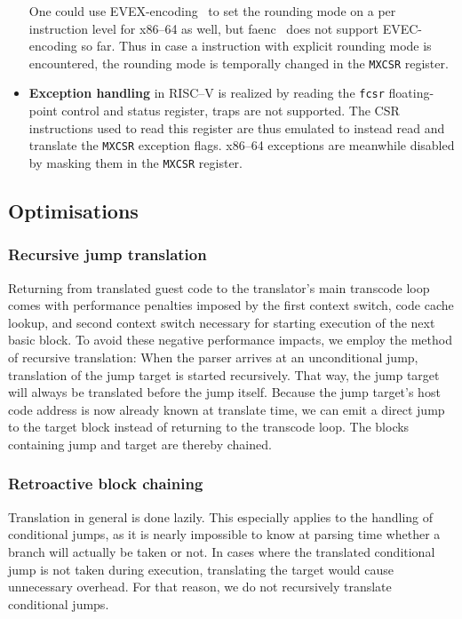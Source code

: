 \begin{itemize}
            One could use EVEX-encoding~\cite[S. 374]{intel2017man} to set the rounding mode on a per instruction level for x86--64 as well, but faenc~\cite{faenc} does not support EVEC-encoding so far.  %
            Thus in case a instruction with explicit rounding mode is encountered, the rounding mode is temporally changed in the \texttt{MXCSR} register.
    \item \textbf{Exception handling} in RISC--V is realized by reading the \texttt{fcsr} floating-point control and status register, traps are not supported.
            The CSR instructions used to read this register are thus emulated to instead read and translate the \texttt{MXCSR} exception flags.
            x86--64 exceptions are meanwhile disabled by masking them in the \texttt{MXCSR} register.
\end{itemize}


\subsection{Optimisations}
\label{sec:optimise}

\subsubsection{Recursive jump translation}
\label{sec:recursive_translation}
Returning from translated guest code to the translator's main transcode loop comes with performance penalties imposed by the first context switch, code cache lookup, and second context switch necessary for starting execution of the next basic block.
To avoid these negative performance impacts, we employ the method of recursive translation: When the parser arrives at an unconditional jump, translation of the jump target is started recursively.
That way, the jump target will always be translated before the jump itself.
Because the jump target's host code address is now already known at translate time, we can emit a direct jump to the target block instead of returning to the transcode loop.
The blocks containing jump and target are thereby chained.

\subsubsection{Retroactive block chaining}
\label{sec:chaining}
Translation in general is done lazily.
This especially applies to the handling of conditional jumps, as it is nearly impossible to know at parsing time whether a branch will actually be taken or not.
In cases where the translated conditional jump is not taken during execution, translating the target would cause unnecessary overhead.
For that reason, we do not recursively translate conditional jumps.

